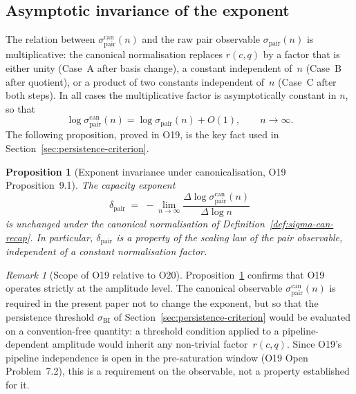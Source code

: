 \documentclass[11pt,a4paper]{article}
\newtheorem{proposition}[theorem]{Proposition}
\theoremstyle{definition}
\theoremstyle{remark}
\newtheorem{remark}[theorem]{Remark}
\begin{document}
    \subsection{Asymptotic invariance of the exponent}
      \label{sec:exponent-invariance}

      The relation between $\sigma_{\mathrm{pair}}^{\mathrm{can}}(n)$ and
      the raw pair observable $\sigma_{\mathrm{pair}}(n)$ is
      multiplicative: the canonical normalisation replaces $r(c,q)$ by a
      factor that is either unity (Case~A after basis change), a constant
      independent of~$n$ (Case~B after quotient), or a product of two
      constants independent of~$n$ (Case~C after both steps).
      In all cases the multiplicative factor is asymptotically constant
      in $n$, so that
      \[
        \log \sigma_{\mathrm{pair}}^{\mathrm{can}}(n)
        = \log \sigma_{\mathrm{pair}}(n) + O(1), \qquad n \to \infty.
      \]
      The following proposition, proved in O19, is the key fact used in
      Section~\ref{sec:persistence-criterion}.

      \begin{proposition}[Exponent invariance under canonicalisation,
        O19 Proposition~9.1]
        \label{prop:exponent-invariance}
        The capacity exponent
        \[
          \delta_{\mathrm{pair}}
          \;=\; -\lim_{n \to \infty}
          \frac{\Delta \log \sigma_{\mathrm{pair}}^{\mathrm{can}}(n)}
          {\Delta \log n}
        \]
        is unchanged under the canonical normalisation of
        Definition~\textup{\ref{def:sigma-can-recap}}.
        In particular, $\delta_{\mathrm{pair}}$ is a property
        of the scaling law of the pair observable, independent of a constant
        normalisation factor.
      \end{proposition}

      \begin{remark}[Scope of O19 relative to O20]
        \label{rem:O19-scope}
        Proposition~\ref{prop:exponent-invariance} confirms that O19
        operates strictly at the amplitude level.
        The canonical observable $\sigma_{\mathrm{pair}}^{\mathrm{can}}(n)$
        is required in the present paper not to change the exponent, but
        so that the persistence threshold $\sigma_{\mathrm{BI}}$ of
        Section~\ref{sec:persistence-criterion} would be evaluated on a
        convention-free quantity: a threshold condition applied to a
        pipeline-dependent amplitude would inherit any non-trivial
        factor~$r(c,q)$.
        Since O19's pipeline independence is open in the pre-saturation window (O19 Open Problem~7.2), this is a requirement on the observable, not a
        property established for it.
      \end{remark}
\end{document}
